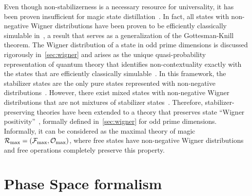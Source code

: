\documentclass[pra,
aps,
twocolumn,
superscriptaddress,
groupedaddress,
nofootinbib,
reprint
]{revtex4-1}
\begin{document}
Even though non-stabilizerness is a necessary resource for universality, it has been proven insufficient for magic state distillation~\cite{cit:bravyi, cit:campbell}.
In fact, all states with non-negative Wigner distributions have been proven to be efficiently classically simulable in~\cite{cit:mari}, a result that serves as a generalization of the Gottesman-Knill theorem.
The Wigner distribution of a state in odd prime dimensions is discussed rigorously in~\cref{sec:wigner} and arises as the unique quasi-probability representation of quantum theory that identifies non-contextuality exactly with the states that are efficiently classically simulable~\cite{cit:howard2, cit:veitch2}.
In this framework, the stabilizer states are the only pure states represented with non-negative distributions~\cite{cit:gross3}. 
However, there exist mixed states with non-negative Wigner distributions that are not mixtures of stabilizer states~\cite{cit:gross}.
Therefore, stabilizer-preserving theories have been extended to a theory that preserves state ``Wigner positivity''~\cite{cit:wang}, formally defined in~\cref{sec:wigner} for odd prime dimensions.
Informally, it can be considered as the maximal theory of magic $\mathcal{R}_{\rm{}max} = (\mathcal{F}_{\rm{max}}, \mathcal{O}_{\rm{}max})$, where free states have non-negative Wigner distributions and free operations completely preserve this property.


\section{Phase Space formalism}
\label{sec:ps}
\end{document}
